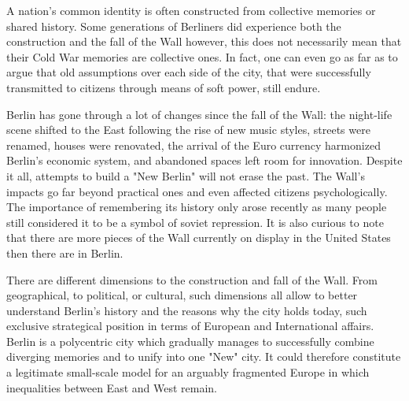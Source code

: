    A nation's common identity is often constructed from collective
   memories or shared history. Some generations of Berliners did
   experience both the construction and the fall of the Wall however, this
   does not necessarily mean that their Cold War memories are collective
   ones. In fact, one can even go as far as to argue that old assumptions
   over each side of the city, that were successfully transmitted to
   citizens through means of soft power, still endure.

   Berlin has gone through a lot of changes since the fall of the Wall:
   the night-life scene shifted to the East following the rise of new
   music styles, streets were renamed, houses were renovated, the arrival
   of the Euro currency harmonized Berlin's economic system, and abandoned
   spaces left room for innovation. Despite it all, attempts to build a
   "New Berlin" will not erase the past. The Wall's impacts go far beyond
   practical ones and even affected citizens psychologically. The
   importance of remembering its history only arose recently as many
   people still considered it to be a symbol of soviet repression. It is
   also curious to note that there are more pieces of the Wall currently
   on display in the United States then there are in Berlin.

   There are different dimensions to the construction and fall of the
   Wall. From geographical, to political, or cultural, such dimensions all
   allow to better understand Berlin's history and the reasons why the
   city holds today, such exclusive strategical position in terms of
   European and International affairs. Berlin is a polycentric city which
   gradually manages to successfully combine diverging memories and to
   unify into one "New" city. It could therefore constitute a legitimate
   small-scale model for an arguably fragmented Europe in which
   inequalities between East and West remain.

